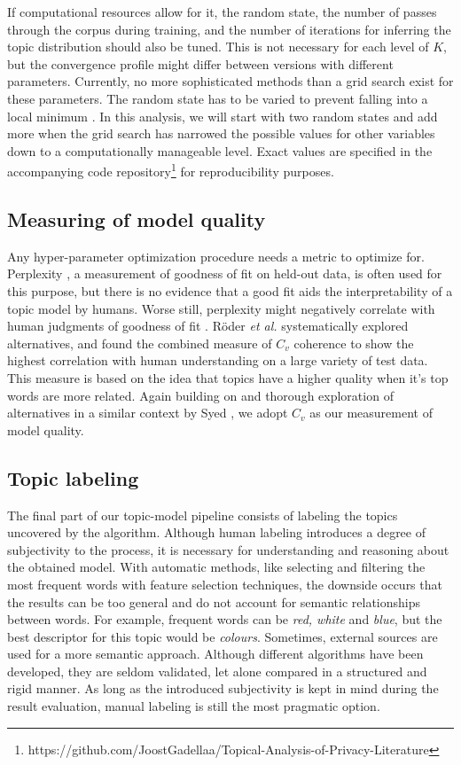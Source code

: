 \documentclass[runningheads]{llncs}
\begin{document}
If computational resources allow for it, the random state, the number of passes through the corpus during training, and the number of iterations for inferring the topic distribution should also be tuned. This is not necessary for each level of $K$, but the convergence profile might differ between versions with different parameters. Currently, no more sophisticated methods than a grid search exist for these parameters. The random state has to be varied to prevent falling into a local minimum \cite{boyd-graber_care_nodate}. In this analysis, we will start with two random states and add more when the grid search has narrowed the possible values for other variables down to a computationally manageable level. Exact values are specified in the accompanying code repository\footnote{https://github.com/JoostGadellaa/Topical-Analysis-of-Privacy-Literature} for reproducibility purposes.

\subsection{Measuring of model quality}
\label{quality}
Any hyper-parameter optimization procedure needs a metric to optimize for. Perplexity \cite{blei2003latent,scott_recursive_2013}, a measurement of goodness of fit on held-out data, is often used for this purpose, but there is no evidence that a good fit aids the interpretability of a topic model by humans\cite{boyd-graber_care_nodate}. Worse still, perplexity might negatively correlate with human judgments of goodness of fit \cite{chang_reading_nodate}. Röder \textit{et al.} \cite{roder_exploring_2015} systematically explored alternatives, and found the combined measure of $C_v$ coherence to show the highest correlation with human understanding on a large variety of test data. This measure is based on the idea that topics have a higher quality when it's top words are more related. Again building on and thorough exploration of alternatives in a similar context by Syed \cite{syed_topic_2019}, we adopt $C_v$ as our measurement of model quality.

\subsection{Topic labeling}
\label{label}
The final part of our topic-model pipeline consists of labeling the topics uncovered by the algorithm. Although human labeling introduces a degree of subjectivity to the process, it is necessary for understanding and reasoning about the obtained model. With automatic methods, like selecting and filtering the most frequent words with feature selection techniques, the downside occurs that the results can be too general and do not account for semantic relationships between words. For example, frequent words can be \textit{red, white} and \textit{blue}, but the best descriptor for this topic would be \textit{colours}. Sometimes, external sources are used for a more semantic approach. Although different algorithms have been developed, they are seldom validated, let alone compared in a structured and rigid manner. As long as the introduced subjectivity is kept in mind during the result evaluation, manual labeling is still the most pragmatic option.
\end{document}
